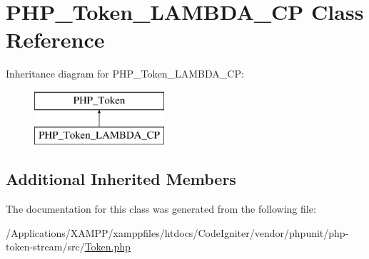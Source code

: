 \hypertarget{class_p_h_p___token___l_a_m_b_d_a___c_p}{}\section{P\+H\+P\+\_\+\+Token\+\_\+\+L\+A\+M\+B\+D\+A\+\_\+\+CP Class Reference}
\label{class_p_h_p___token___l_a_m_b_d_a___c_p}
Inheritance diagram for P\+H\+P\+\_\+\+Token\+\_\+\+L\+A\+M\+B\+D\+A\+\_\+\+CP\+:\begin{figure}[H]
\begin{center}
\leavevmode
\includegraphics[height=2.000000cm]{class_p_h_p___token___l_a_m_b_d_a___c_p}
\end{center}
\end{figure}
\subsection*{Additional Inherited Members}


The documentation for this class was generated from the following file\+:\begin{DoxyCompactItemize}
\item 
/\+Applications/\+X\+A\+M\+P\+P/xamppfiles/htdocs/\+Code\+Igniter/vendor/phpunit/php-\/token-\/stream/src/\mbox{\hyperlink{_token_8php}{Token.\+php}}\end{DoxyCompactItemize}
